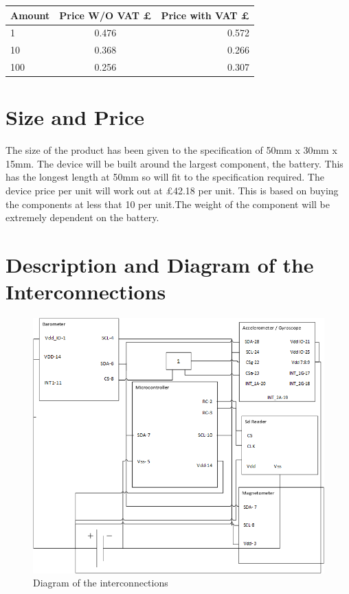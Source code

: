 \documentclass{report}
\begin{document}
\begin{center}
  \begin{tabular}{ | l | c | r |}
    \hline
    Amount & Price W/O VAT £ & Price with VAT £ \\ \hline
    1 & 0.476 & 0.572 \\ \hline
    10 & 0.368 & 0.266 \\ \hline
    100 & 0.256 & 0.307 \\ \hline
	\end{tabular}
\end{center}


\section{Size and Price}
The size of the product  has been given to the specification of 50mm x 30mm x 15mm. The device will be built around the largest component, the battery. This has the longest length at 50mm so will fit to the specification required.
The device price per unit will work out at £42.18 per unit. This is based on buying the components at less that 10 per unit.The weight of the component will be extremely dependent on the battery.
\section{Description and Diagram of the Interconnections}

\begin{figure}[ht!]
\centering
\includegraphics[width=115mm]{MainImage.png}
\caption{Diagram of the interconnections}
\label{overflow}
\end{figure}
\end{document}
